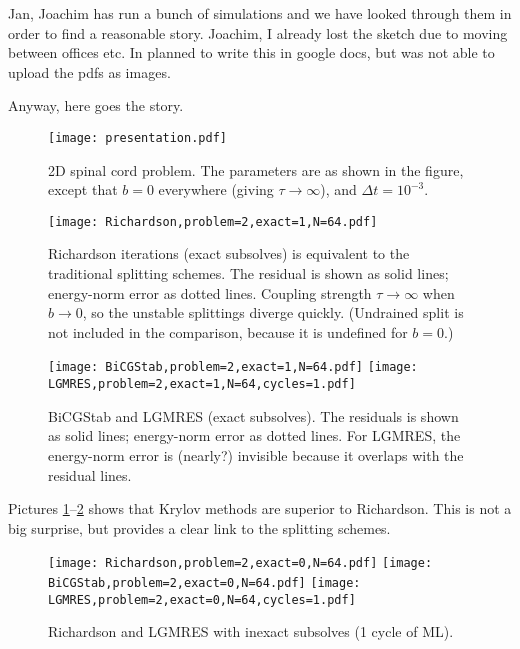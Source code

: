 \documentclass{article}
\begin{document}
Jan, Joachim has run a bunch of simulations and we have looked through them in order to find a reasonable story. 
Joachim, I already lost the sketch due to moving between offices etc. In planned to write this in google
docs, but was not able to upload the pdfs as images.  

Anyway, here goes the story. 


\begin{figure}
\begin{center}
\texttt{[image: presentation.pdf]}
\caption{2D spinal cord problem. The parameters are as shown in the figure, except that $b=0$ everywhere (giving $\tau\rightarrow\infty$), and $\Delta t=10^{-3}$.}
\end{center}
\end{figure}

\begin{figure}
\begin{center}
\texttt{[image: Richardson,problem=2,exact=1,N=64.pdf]}
\caption{Richardson iterations (exact subsolves) is equivalent to the traditional splitting schemes. The residual is shown as solid lines; energy-norm error as dotted lines. Coupling strength $\tau\rightarrow\infty$ when $b\rightarrow 0$, so the unstable splittings diverge quickly. (Undrained split is not included in the comparison, because it is undefined for $b=0$.)} 
\label{2dsc-richardson-exact}
\end{center}
\end{figure}

\begin{figure}
\begin{center}
\texttt{[image: BiCGStab,problem=2,exact=1,N=64.pdf]}
\texttt{[image: LGMRES,problem=2,exact=1,N=64,cycles=1.pdf]}
\caption{BiCGStab and LGMRES (exact subsolves). The residuals is shown as solid lines; energy-norm error as dotted lines. For LGMRES, the energy-norm error is (nearly?) invisible because it overlaps with the residual lines. }
\label{2dsc-bicgstab-lgmres-exact}
\end{center}
\end{figure}

Pictures \ref{2dsc-richardson-exact}--\ref{2dsc-bicgstab-lgmres-exact} shows that Krylov methods are superior to Richardson. This is not a big surprise, but provides
a clear link to the splitting schemes.

\begin{figure}
\begin{center}
\texttt{[image: Richardson,problem=2,exact=0,N=64.pdf]}
\texttt{[image: BiCGStab,problem=2,exact=0,N=64.pdf]}
\texttt{[image: LGMRES,problem=2,exact=0,N=64,cycles=1.pdf]}
\caption{Richardson and LGMRES with inexact subsolves (1 cycle of ML).} 
\label{2dsc-richardson-lgmres-inexact}
\end{center}
\end{figure}
\end{document}
